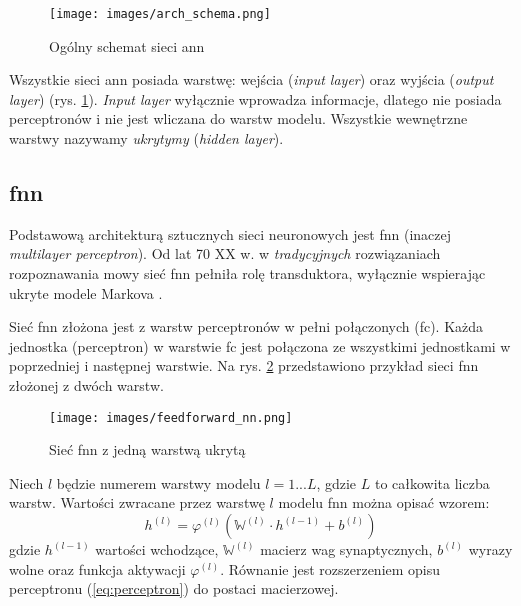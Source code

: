 \begin{figure}
    \centering
    \texttt{[image: images/arch\_schema.png]}
    \caption{Ogólny schemat sieci \acrshort{ann}}
    \label{fig:arch_schema}
\end{figure}

Wszystkie sieci \acrshort{ann} posiada warstwę: wejścia (\textit{input layer}) oraz wyjścia (\textit{output layer}) (rys. \ref{fig:arch_schema}). \textit{Input layer} wyłącznie wprowadza informacje, dlatego nie posiada perceptronów i nie jest wliczana do warstw modelu. Wszystkie wewnętrzne warstwy nazywamy \emph{ukrytymy} (\textit{hidden layer}). 

\subsection*{\acrfull{fnn}}
Podstawową architekturą sztucznych sieci neuronowych jest \acrshort{fnn} (inaczej \textit{multilayer perceptron}). Od lat 70 XX w. w \textit{tradycyjnych} rozwiązaniach rozpoznawania mowy sieć \acrshort{fnn} pełniła rolę transduktora, wyłącznie wspierając ukryte modele Markova \cite{ds1:feature_learning, ds1:dnn_timit, ds1:accustic_modeling, ds1:dnn_hmh}. 

Sieć \acrshort{fnn} złożona jest z warstw perceptronów w pełni połączonych (\acrshort{fc}). Każda jednostka (perceptron) w warstwie \acrshort{fc} jest połączona ze wszystkimi jednostkami w poprzedniej i następnej warstwie. Na rys. \ref{fig:feedforward_nn} przedstawiono przykład sieci \acrshort{fnn} złożonej z dwóch warstw. 

\begin{figure}
    \centering
    \texttt{[image: images/feedforward\_nn.png]}
    \caption{Sieć \acrshort{fnn} z jedną warstwą ukrytą}
    \label{fig:feedforward_nn}
\end{figure}

Niech $l$ będzie numerem warstwy modelu $l=1...L$, gdzie $L$ to całkowita liczba warstw. Wartości zwracane przez warstwę $l$ modelu \acrshort{fnn} można opisać wzorem:
\begin{equation}
h^{(l)} = \varphi^{(l)} (\mathbb{W}^{(l)} \cdot h^{(l-1)} + b^{(l)})
\end{equation}
gdzie $h^{(l-1)}$ wartości wchodzące, $\mathbb{W}^{(l)}$ macierz wag synaptycznych, $b^{(l)}$ wyrazy wolne oraz funkcja aktywacji $\varphi^{(l)}$. Równanie jest rozszerzeniem opisu perceptronu (\ref{eq:perceptron}) do postaci macierzowej. 

